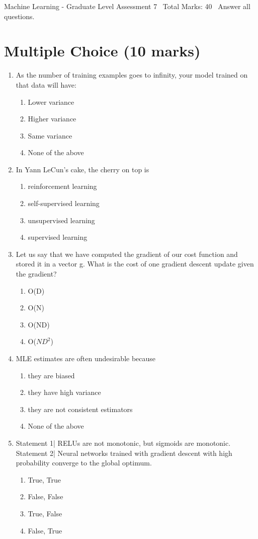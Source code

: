 \documentclass[12pt]{article}
\begin{document}
\begin{center}
Machine Learning - Graduate Level Assessment 7 \
Total Marks: 40 \
Answer all questions.
\end{center}

\section*{Multiple Choice (10 marks)}
\begin{enumerate}[label=\arabic*.]
\item As the number of training examples goes to infinity, your model trained on that data will have:
\begin{enumerate}[label=(\alph*)]
    \item Lower variance
    \item Higher variance
    \item Same variance
    \item None of the above
\end{enumerate}
\item In Yann LeCun's cake, the cherry on top is
\begin{enumerate}[label=(\alph*)]
    \item reinforcement learning
    \item self-supervised learning
    \item unsupervised learning
    \item supervised learning
\end{enumerate}
\item Let us say that we have computed the gradient of our cost function and stored it in a vector g. What is the cost of one gradient descent update given the gradient?
\begin{enumerate}[label=(\alph*)]
    \item O(D)
    \item O(N)
    \item O(ND)
    \item O($ND^2$)
\end{enumerate}
\item MLE estimates are often undesirable because
\begin{enumerate}[label=(\alph*)]
    \item they are biased
    \item they have high variance
    \item they are not consistent estimators
    \item None of the above
\end{enumerate}
\item Statement 1| RELUs are not monotonic, but sigmoids are monotonic. Statement 2| Neural networks trained with gradient descent with high probability converge to the global optimum.
\begin{enumerate}[label=(\alph*)]
    \item True, True
    \item False, False
    \item True, False
    \item False, True
\end{enumerate}
\end{enumerate}
\end{document}
